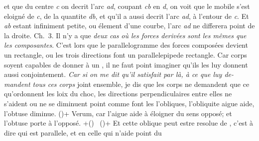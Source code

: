 %
et que du centre \textit{c} on decrit l'arc \textit{ad}, coupant \textit{cb} en \textit{d}, on voit que le mobile 
%
s'est eloigné de \textit{c}, de la quantite \textit{db}, et qu'il a aussi decrit l'arc \textit{ad}, à l'entour de \textit{c}.
%
Et \textit{ab} estant infiniment petite, ou élement d'une courbe, l'arc \textit{ad} ne differera point 
%
de la droite. 
\pend
%
%
\pstart
Ch.~3. 
%
Il n'y a que \textit{deux cas} 
%
\textit{où les forces derivées\protect{} sont les mêmes que les 
%
composantes\protect{}}. C'est lors que le parallelogramme des 
%
forces composées devient un rectangle, ou les trois directions font 
%
un parallelepipede rectangle. Car
%
%
corps soyent capables de donner à un
%
,
%
 il ne faut point imaginer qu'ils les luy donnent aussi conjointement. 
%
\textit{Car si on me dit qu'il satisfait par là, à ce que luy de-}
\pend
\newpage
\pstart
\noindent \textit{mandent tous ces corps} joint 
%
ensemble, je dis que les corps ne demandent que ce qu'ordonnent 
%
les loix du choc, les 
%
%
directions perpendiculaires entre elles ne s'aident ou ne se diminuent point comme font les l'obliques, 
%
l'obliquite aigue aide, l'obtuse diminue. (\protect\vphantom)+ Verum, car l'aigue aide
%
à éloigner du sens opposé; et l'obtuse porte à l'opposé. \lbrack+\protect\vphantom()\rbrack\ 
%
(\protect\vphantom)+ Et cette oblique 
%
%
peut estre resolue de 
%
,
%
 c'est à dire qui est parallele, et en celle qui n'aide point du
%
